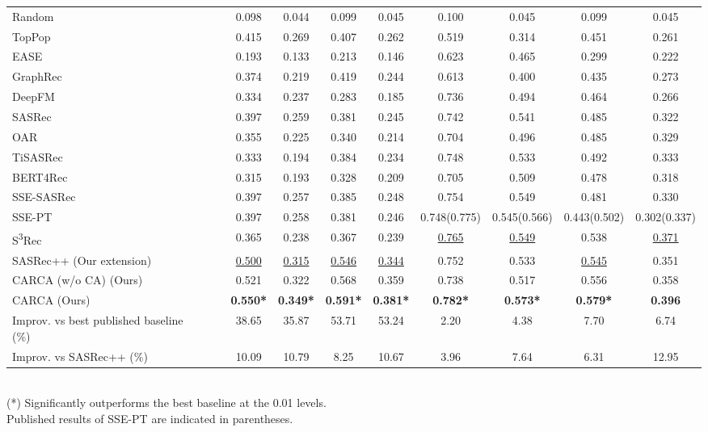 \documentclass[sigconf,natbib=true]{acmart}
\newcommand{\cmark}{\ding{51}}\newcommand{\xmark}{\ding{55}}\settopmatter{printacmref=false}
\begin{document}
\begin{table*}[!ht]
\begin{center}
\begin{tabular}{l|ccc|cccccccc}
Random &&& & 0.098 & 0.044 & 0.099 & 0.045 & 0.100& 0.045& 0.099 & 0.045\\
TopPop &&& & 0.415 & 0.269 & 0.407 & 0.262 & 0.519& 0.314& 0.451 & 0.261\\
EASE  \cite{steck2019embarrassingly}&&&& 0.193 & 0.133 & 0.213 & 0.146 & 0.623& 0.465& 0.299 & 0.222\\
GraphRec \cite{rashed2019attribute}&\cmark&&    & 0.374 & 0.219 & 0.419 & 0.244 & 0.613& 0.400& 0.435& 0.273   \\
DeepFM \cite{guo2017deepfm}&\cmark&\cmark& & 0.334 & 0.237 & 0.283 & 0.185 & 0.736& 0.494& 0.464& 0.266   \\
SASRec \cite{kang2018self}&&&\cmark     & 0.397 & 0.259 & 0.381 & 0.245 & 0.742& 0.541& 0.485 & 0.322\\
OAR \cite{wang2020time}&&\cmark&\cmark     & 
0.355&	0.225&	0.340&	0.214&	0.704&	0.496&	0.485&	0.329\\
TiSASRec \cite{li2020time}&&\cmark&\cmark     & 
0.333 & 0.194	& 0.384 &	0.234 & 0.748&	0.533&	 0.492& 0.333\\
BERT4Rec \cite{sun2019bert4rec}&&&\cmark & 0.315 & 0.193 & 0.328 & 0.209 & 0.705& 0.509& 0.478 & 0.318\\
SSE-SASRec \cite{wu2019stochastic}&&&\cmark & 0.397 & 0.257 & 0.385 & 0.248 & 0.754& 0.549& 0.481 & 0.330\\
SSE-PT    \cite{wu2020sse}&&&\cmark  & 0.397 & 0.258 & 0.381 & 0.246 & 0.748(0.775)& 0.545(0.566)& 0.443(0.502) & 0.302(0.337)\\
S\textsuperscript{3}Rec  \cite{ZhouWZZWZWW20}&\cmark&&\cmark     & 0.365 & 0.238 & 0.367 & 0.239 & \underline{0.765}& \underline{0.549}& 0.538 & \underline{0.371}\\
\midrule
SASRec++ (Our extension)&\cmark &\cmark &\cmark    &  \underline{0.500} & \underline{0.315} & \underline{0.546} & \underline{0.344} & 0.752& 0.533& \underline{0.545} & 0.351\\
\midrule
CARCA  (w/o CA) (Ours) &\cmark &\cmark &\cmark   &0.521    & 	0.322 &   0.568	    &   0.359&  0.738	&   0.517   &   0.556 &    	0.358\\
CARCA  (Ours)&\cmark &\cmark &\cmark   & \textbf{0.550*}&\textbf{ 0.349*} & \textbf{0.591*} &\textbf{ 0.381*} &\textbf{0.782*} & \textbf{0.573*}& \textbf{0.579*} & \textbf{0.396}\\ 
   \bottomrule
 \bottomrule
\multicolumn{1}{l}{Improv. vs best published baseline (\%)}& && &38.65 & 35.87 & 53.71 & 53.24 & 2.20 & 4.38 & 7.70 &	6.74 \\ 
\multicolumn{1}{l}{Improv. vs SASRec++ (\%)} & && &10.09&10.79&8.25&10.67&3.96&7.64&6.31&12.95 \\
   \bottomrule
\end{tabular}
  \\ \small (*) Significantly outperforms the best baseline at the 0.01 levels. 
  \\ Published results of SSE-PT are indicated in parentheses. 
  \end{center}
\end{table*}
\end{document}
